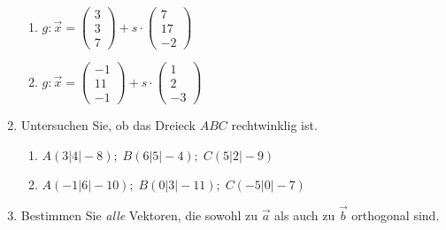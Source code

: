 \documentclass[12pt,a4paper,twoside,fleqn]{article}
\begin{document}
\begin{enumerate}
\begin{multicols}{2}
  \begin{enumerate}
  \item $g: \vec{x}=   
    \begin{pmatrix}
      3\\3\\7
    \end{pmatrix} 
    + s\cdot
    \begin{pmatrix}
      7\\17\\-2
    \end{pmatrix}$
  \item $g: \vec{x}=   
    \begin{pmatrix}
      -1\\11\\-1
    \end{pmatrix} 
    + s\cdot
    \begin{pmatrix}
      1\\2\\-3
    \end{pmatrix}$ 
  \end{enumerate}
\end{multicols}
\item Untersuchen Sie, ob das Dreieck $ABC$ rechtwinklig ist.
   \begin{enumerate}
  \item $A(3|4|-8);\; B(6|5|-4) ;\; C(5|2|-9)$
  \item $A(-1|6|-10);\; B(0|3|-11) ;\; C(-5|0|-7)$
  \end{enumerate}
\item Bestimmen Sie {\em alle} Vektoren, die sowohl zu $\vec{a}$ als
  auch zu $\vec{b}$ orthogonal sind.
  \begin{multicols}{2}
\end{multicols}
\end{enumerate}
\end{document}

